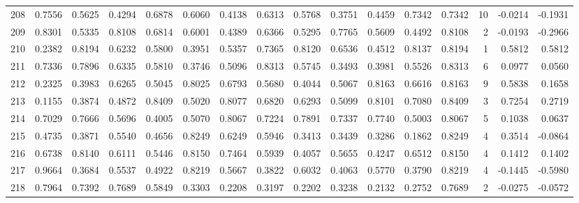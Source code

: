 \begin{tabular}{lrrrrrrrrrrrrrrr}
208 &      0.7556 &  0.5625 &  0.4294 &  0.6878 &  0.6060 &  0.4138 &  0.6313 &  0.5768 &  0.3751 &  0.4459 &   0.7342 &     0.7342 &     10 &                   -0.0214 &                    -0.1931 \\
209 &      0.8301 &  0.5335 &  0.8108 &  0.6814 &  0.6001 &  0.4389 &  0.6366 &  0.5295 &  0.7765 &  0.5609 &   0.4492 &     0.8108 &      2 &                   -0.0193 &                    -0.2966 \\
210 &      0.2382 &  0.8194 &  0.6232 &  0.5800 &  0.3951 &  0.5357 &  0.7365 &  0.8120 &  0.6536 &  0.4512 &   0.8137 &     0.8194 &      1 &                    0.5812 &                     0.5812 \\
211 &      0.7336 &  0.7896 &  0.6335 &  0.5810 &  0.3746 &  0.5096 &  0.8313 &  0.5745 &  0.3493 &  0.3981 &   0.5526 &     0.8313 &      6 &                    0.0977 &                     0.0560 \\
212 &      0.2325 &  0.3983 &  0.6265 &  0.5045 &  0.8025 &  0.6793 &  0.5680 &  0.4044 &  0.5067 &  0.8163 &   0.6616 &     0.8163 &      9 &                    0.5838 &                     0.1658 \\
213 &      0.1155 &  0.3874 &  0.4872 &  0.8409 &  0.5020 &  0.8077 &  0.6820 &  0.6293 &  0.5099 &  0.8101 &   0.7080 &     0.8409 &      3 &                    0.7254 &                     0.2719 \\
214 &      0.7029 &  0.7666 &  0.5696 &  0.4005 &  0.5070 &  0.8067 &  0.7224 &  0.7891 &  0.7337 &  0.7740 &   0.5003 &     0.8067 &      5 &                    0.1038 &                     0.0637 \\
215 &      0.4735 &  0.3871 &  0.5540 &  0.4656 &  0.8249 &  0.6249 &  0.5946 &  0.3413 &  0.3439 &  0.3286 &   0.1862 &     0.8249 &      4 &                    0.3514 &                    -0.0864 \\
216 &      0.6738 &  0.8140 &  0.6111 &  0.5446 &  0.8150 &  0.7464 &  0.5939 &  0.4057 &  0.5655 &  0.4247 &   0.6512 &     0.8150 &      4 &                    0.1412 &                     0.1402 \\
217 &      0.9664 &  0.3684 &  0.5537 &  0.4922 &  0.8219 &  0.5667 &  0.3822 &  0.6032 &  0.4063 &  0.5770 &   0.3790 &     0.8219 &      4 &                   -0.1445 &                    -0.5980 \\
218 &      0.7964 &  0.7392 &  0.7689 &  0.5849 &  0.3303 &  0.2208 &  0.3197 &  0.2202 &  0.3238 &  0.2132 &   0.2752 &     0.7689 &      2 &                   -0.0275 &                    -0.0572 \\

\end{tabular}
